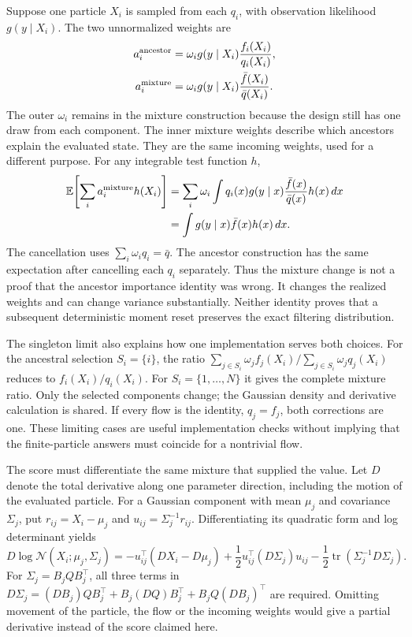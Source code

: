 Suppose one particle $X_i$ is sampled from each $q_i$, with observation likelihood
$g(y\mid X_i)$.  The two unnormalized weights are
\begin{align}
 a_i^{\rm ancestor}
 &=\omega_i g(y\mid X_i)\frac{f_i(X_i)}{q_i(X_i)},\\
 a_i^{\rm mixture}
 &=\omega_i g(y\mid X_i)\frac{\bar f(X_i)}{\bar q(X_i)}.
 \label{eq:bf-hd-marginal-two-weights}
\end{align}
The outer $\omega_i$ remains in the mixture construction because the design
still has one draw from each component.  The inner mixture weights describe
which ancestors explain the evaluated state.  They are the same incoming
weights, used for a different purpose.  For any integrable test function $h$,
\begin{align}
 \mathbb E\!\left[\sum_i a_i^{\rm mixture}h(X_i)\right]
 &=\sum_i\omega_i\int q_i(x)g(y\mid x)
       \frac{\bar f(x)}{\bar q(x)}h(x)\,dx\\
 &=\int g(y\mid x)\bar f(x)h(x)\,dx.
 \label{eq:bf-hd-marginal-weight-identity}
\end{align}
The cancellation uses $\sum_i\omega_iq_i=\bar q$.  The ancestor construction
has the same expectation after cancelling each $q_i$ separately.  Thus the
mixture change is not a proof that the ancestor importance identity was wrong.
It changes the realized weights and can change variance substantially.  Neither
identity proves that a subsequent deterministic moment reset preserves the
exact filtering distribution.

The singleton limit also explains how one implementation serves both choices.
For the ancestral selection $S_i=\{i\}$, the ratio
$\sum_{j\in S_i}\omega_j f_j(X_i)/
 \sum_{j\in S_i}\omega_j q_j(X_i)$ reduces to $f_i(X_i)/q_i(X_i)$.
For $S_i=\{1,\ldots,N\}$ it gives the complete mixture ratio.  Only the selected
components change; the Gaussian density and derivative calculation is shared.
If every flow is the identity, $q_j=f_j$, both corrections are one.  These
limiting cases are useful implementation checks without implying that the
finite-particle answers must coincide for a nontrivial flow.

The score must differentiate the same mixture that supplied the value.
Let $D$ denote the total derivative along one parameter direction, including
the motion of the evaluated particle.  For a Gaussian component with mean
$\mu_j$ and covariance $\Sigma_j$, put
$r_{ij}=X_i-\mu_j$ and $u_{ij}=\Sigma_j^{-1}r_{ij}$.  Differentiating its
quadratic form and log determinant yields
\begin{equation}
 D\log\mathcal N(X_i;\mu_j,\Sigma_j)
 =-u_{ij}^{\top}(DX_i-D\mu_j)
 +\frac12u_{ij}^{\top}(D\Sigma_j)u_{ij}
 -\frac12\operatorname{tr}(\Sigma_j^{-1}D\Sigma_j).
 \label{eq:bf-hd-marginal-gaussian-tangent}
\end{equation}
For $\Sigma_j=B_jQB_j^\top$, all three terms in
$D\Sigma_j=(DB_j)QB_j^\top+B_j(DQ)B_j^\top+B_jQ(DB_j)^\top$
are required.  Omitting movement of the particle, the flow or the incoming
weights would give a partial derivative instead of the score claimed here.

